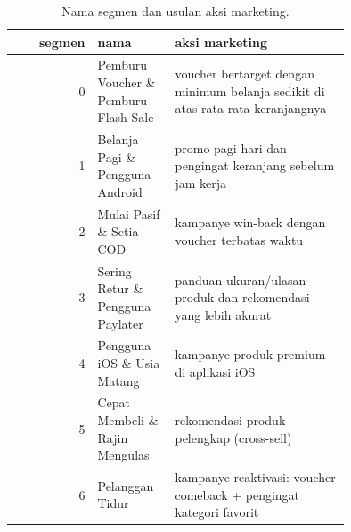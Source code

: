 \begin{table}[ht]
\centering\small
\begin{tabular}{rp{0.23\linewidth}p{0.52\linewidth}}
\toprule
segmen & nama & aksi marketing \\
\midrule
0 & Pemburu Voucher \& Pemburu Flash Sale & voucher bertarget dengan minimum belanja sedikit di atas rata-rata keranjangnya \\
1 & Belanja Pagi \& Pengguna Android & promo pagi hari dan pengingat keranjang sebelum jam kerja \\
2 & Mulai Pasif \& Setia COD & kampanye win-back dengan voucher terbatas waktu \\
3 & Sering Retur \& Pengguna Paylater & panduan ukuran/ulasan produk dan rekomendasi yang lebih akurat \\
4 & Pengguna iOS \& Usia Matang & kampanye produk premium di aplikasi iOS \\
5 & Cepat Membeli \& Rajin Mengulas & rekomendasi produk pelengkap (cross-sell) \\
6 & Pelanggan Tidur & kampanye reaktivasi: voucher comeback + pengingat kategori favorit \\
\bottomrule
\end{tabular}
\caption{Nama segmen dan usulan aksi marketing.}
\label{tab:t3_aksi}
\end{table}
